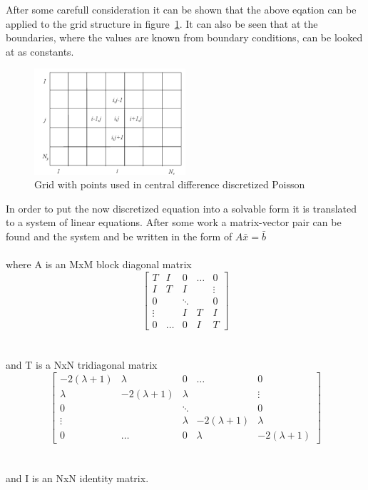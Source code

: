 \documentclass[]{aiaa-tc}%
\begin{document}
After some carefull consideration it can be shown that the above eqation can be
applied to the grid structure in figure~\ref{f:cdiff_grid}. It can also be seen
that at the boundaries, where the values are known from boundary conditions, can
be looked at as constants.

\begin{figure}
  \centering
  \label{f:cdiff_grid}
  \caption{Grid with points used in central difference discretized Poisson}
  \includegraphics[width=0.5\textwidth]{cdiff_grid.png}
\end{figure}

In order to put the now discretized equation into a solvable form it is translated
to a system of linear equations. After some work a matrix-vector pair can
be found and the system and be written in the form of $A \bar x = \bar b$
\\\\
where A is an MxM block diagonal matrix
$$
\begin{bmatrix}
  T      & I     &     0   & \dots & 0 \\
  I     & T      & I     &  & \vdots \\
  0 &  & \ddots &  & 0 \\
  \vdots &   & I     & T & I \\
  0      & \dots  &  0     & I & T
\end{bmatrix}
$$
\\\\
and T is a NxN tridiagonal matrix
$$
\begin{bmatrix}
  -2(\lambda + 1)      & \lambda     &     0   & \dots & 0 \\
  \lambda     & -2(\lambda + 1)      & \lambda     &  & \vdots \\
  0 &  & \ddots &  & 0 \\
  \vdots &   & \lambda     & -2(\lambda + 1) & \lambda \\
  0      & \dots  &  0     & \lambda & -2(\lambda + 1)
\end{bmatrix}
$$
\\\\
and I is an NxN identity matrix.
\end{document}
